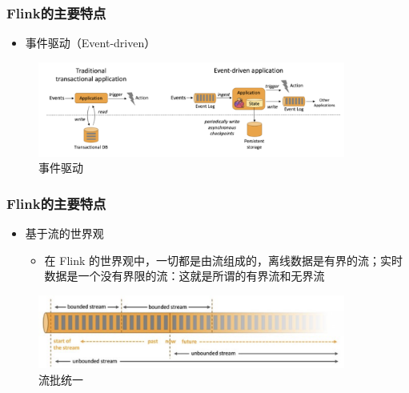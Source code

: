 \documentclass{beamer}
\begin{document}
  \begin{frame}
    \frametitle{Flink的主要特点}
  
    \begin{itemize}
      \item 事件驱动（Event-driven）
    \end{itemize}

    \begin{figure}
      \centering
      \includegraphics[width=0.9\textwidth]{image9.png}
      \caption{事件驱动}
    \end{figure}
  
  \end{frame}

  \begin{frame}
    \frametitle{Flink的主要特点}
  
    \begin{itemize}
      \item 基于流的世界观
        \begin{itemize}
          \item 在 Flink 的世界观中，一切都是由流组成的，离线数据是有界的流；实时数据是一个没有界限的流：这就是所谓的有界流和无界流
        \end{itemize}
    \end{itemize}

    \begin{figure}
      \centering
      \includegraphics[width=0.9\textwidth]{image10.png}
      \caption{流批统一}
    \end{figure}
  
  \end{frame}
\end{document}
